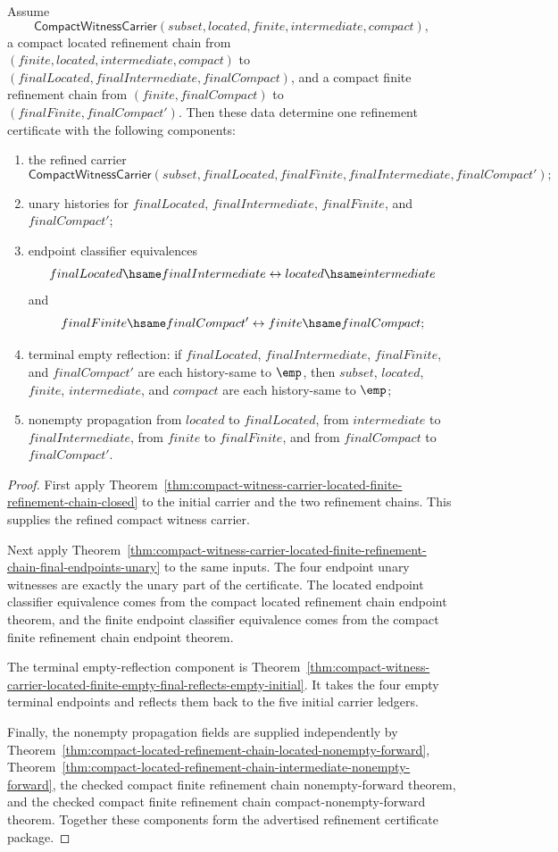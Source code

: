 \begin{theorem}
\label{thm:compact-witness-carrier-located-finite-refinement-complete-package}
Assume
$$
\mathsf{CompactWitnessCarrier}(subset,located,finite,intermediate,compact),
$$
a compact located refinement chain from
$(finite,located,intermediate,compact)$ to
$(finalLocated,finalIntermediate,finalCompact)$, and a compact finite
refinement chain from $(finite,finalCompact)$ to
$(finalFinite,finalCompact')$. Then these data determine one refinement
certificate with the following components:
\begin{enumerate}
\item the refined carrier
$$
\mathsf{CompactWitnessCarrier}(subset,finalLocated,finalFinite,
finalIntermediate,finalCompact');
$$
\item unary histories for $finalLocated$, $finalIntermediate$, $finalFinite$,
and $finalCompact'$;
\item endpoint classifier equivalences
$$
finalLocated\hsame finalIntermediate\leftrightarrow located\hsame intermediate
$$
and
$$
finalFinite\hsame finalCompact'\leftrightarrow finite\hsame finalCompact;
$$
\item terminal empty reflection: if $finalLocated$, $finalIntermediate$,
$finalFinite$, and $finalCompact'$ are each history-same to $\emp$, then
$subset$, $located$, $finite$, $intermediate$, and $compact$ are each
history-same to $\emp$;
\item nonempty propagation from $located$ to $finalLocated$, from
$intermediate$ to $finalIntermediate$, from $finite$ to $finalFinite$, and
from $finalCompact$ to $finalCompact'$.
\end{enumerate}
\end{theorem}
\begin{proof}
First apply
Theorem~\ref{thm:compact-witness-carrier-located-finite-refinement-chain-closed}
to the initial carrier and the two refinement chains. This supplies the
refined compact witness carrier.

Next apply
Theorem~\ref{thm:compact-witness-carrier-located-finite-refinement-chain-final-endpoints-unary}
to the same inputs. The four endpoint unary witnesses are exactly the unary
part of the certificate. The located endpoint classifier equivalence comes
from the compact located refinement chain endpoint theorem, and the finite
endpoint classifier equivalence comes from the compact finite refinement chain
endpoint theorem.

The terminal empty-reflection component is
Theorem~\ref{thm:compact-witness-carrier-located-finite-empty-final-reflects-empty-initial}.
It takes the four empty terminal endpoints and reflects them back to the five
initial carrier ledgers.

Finally, the nonempty propagation fields are supplied independently by
Theorem~\ref{thm:compact-located-refinement-chain-located-nonempty-forward},
Theorem~\ref{thm:compact-located-refinement-chain-intermediate-nonempty-forward},
the checked compact finite refinement chain nonempty-forward theorem, and the
checked compact finite refinement chain compact-nonempty-forward theorem.
Together these components form the advertised refinement certificate package.
\end{proof}
